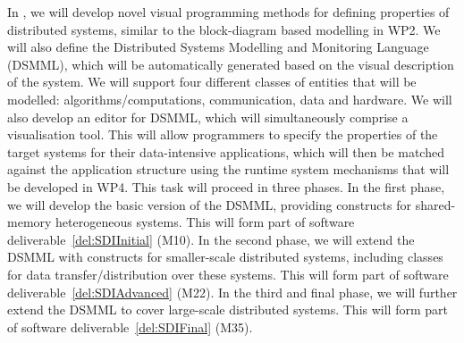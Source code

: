 \begin{Workpackage}{\thewpno}
\begin{Task}
\TaskResults{
\ref{del:SDIInitial}
\ref{del:SDIAdvanced}
\ref{del:SDIFinal}
}
\TaskHeader{}
In \theTask, we will develop novel visual programming methods for defining properties of distributed systems,
similar to the block-diagram based modelling in WP2. We will also define the Distributed Systems Modelling 
and Monitoring Language (DSMML), which %
will be automatically generated based on the visual description of the system. We will support four different
classes of entities that will be modelled: algorithms/computations, communication, data and hardware.
We will also develop an editor for DSMML, which will simultaneously comprise a visualisation tool. This will allow
programmers to specify the properties of the target systems for their data-intensive applications, which will then
be matched against the application structure using the runtime system mechanisms that will be developed in WP4.
This task will proceed in three phases. In the first phase, we will develop the basic version of the DSMML,
providing constructs for shared-memory heterogeneous systems. This will form part of software deliverable~\ref{del:SDIInitial} (M10). In the second
phase, we will extend the DSMML with constructs for smaller-scale distributed systems, including classes for
data transfer/distribution over these systems. This will form part of software deliverable~\ref{del:SDIAdvanced} (M22). In the third and final phase,
we will further extend the DSMML to cover large-scale distributed systems. This will form part of software deliverable~\ref{del:SDIFinal} (M35).



\end{Task}
\end{Workpackage}
